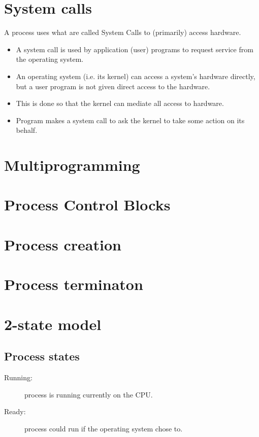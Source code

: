 \section{System calls}

A process uses what are called System Calls to (primarily) access hardware. 

\begin{itemize}
\item A system call is used by application (user) programs to request service from the operating system.
\item An operating system (i.e. its kernel) can access a system's hardware directly, but a user program is not given direct access to the hardware.
\item This is done so that the kernel can mediate all access to hardware.
\item Program makes a system call to ask the kernel to take some action on its behalf. 
\end{itemize}

\section{Multiprogramming}

\section{Process Control Blocks}

\section{Process creation}

\section{Process terminaton}

\section{2-state model}

\subsection{Process states}

\begin{description}
\item[Running:] process is running currently on the CPU.
\item[Ready:] process could run if the operating system chose to.
\end{description}

